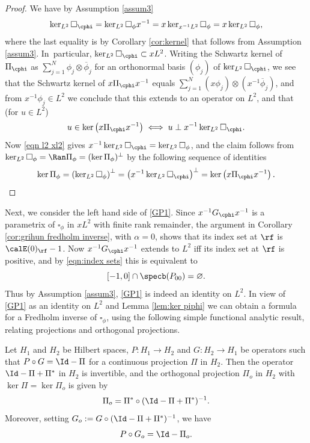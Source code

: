 \begin{proof}
We have by Assumption \ref{assum3}
\begin{equation}
\label{eqn l2 xl2}
\ker_{L^2} \square_{\cphi} = \ker_{L^2} \square_\phi x^{-1} = x\ker_{x^{-1}L^2} \square_\phi = x\ker_{L^2}\square_\phi,
\end{equation}
where the last equality is by Corollary \ref{cor:kernel} that follows from Assumption \ref{assum3}.
In~particular, $\ker_{L^2} \square_{\cphi}\subset xL^2$. Writing the Schwartz kernel of $\Pi_{\cphi}$ as $\sum_{j=1}^N \phi_j\otimes\overline\phi_j$ for an orthonormal basis $(\phi_j)$ of $\ker_{L^2} \square_{\cphi}$, we see that the Schwartz kernel of $x\Pi_{\cphi}x^{-1}$ equals $\sum_{j=1}^N (x\phi_j)\otimes(x^{-1}\overline\phi_j)$, and from $x^{-1}\phi_j\in L^2$ we conclude that this extends to an operator on $L^2$, and that (for $u \in L^2$)
\[
u\in \ker \left(x \Pi_{\cphi} x^{-1} \right) \iff u \perp x^{-1}\ker_{L^2} \square_{\cphi}.
\]
Now \eqref{eqn l2 xl2} gives $ x^{-1}\ker_{L^2} \square_{\cphi}=\ker_{L^2}\square_\phi$, and the claim follows from $\ker_{L^2}\square_\phi = \Ran\Pi_\phi=(\ker\Pi_\phi)^\perp$ by the following sequence of identities
\[
\ker \Pi_\phi = \left(\ker_{L^2} \square_\phi \right)^\perp
= \left(x^{-1} \ker_{L^2} \square_{\cphi} \right)^\perp = \ker \left(x \Pi_{\cphi} x^{-1}\right).\qedhere
\]
\end{proof}
Next, we consider the left hand side of \eqref{GP1}.
Since $x^{-1}G_{\cphi}x^{-1}$ is a parametrix of $\square_\phi$ in $xL^2$ with finite rank remainder, the argument in Corollary \ref{cor:grihun fredholm inverse}, with $\alpha=0$, shows that its index set at $\rf$ is $\calE(0)_\rf - 1$. Now $x^{-1}G_{\cphi}x^{-1}$ extends to $L^2$ iff its index set at $\rf$ is positive, and by \eqref{eqn:index sets} this is equivalent to
\begin{equation}
\label{eqn:-1,0 condition}
[-1,0]\cap \specb(P_{00})=\varnothing.
\end{equation}
Thus by Assumption \ref{assum3}, \eqref{GP1} is indeed an identity on $L^2$.
In view of \eqref{GP1} as an identity on $L^2$ and Lemma \ref{lem:ker piphi} we can obtain a formula for a Fredholm inverse of
$\square_\phi$, using the following simple functional analytic result, relating projections and orthogonal projections.

\begin{Lemma}\label{funkana}
Let $H_1$ and $H_2$ be Hilbert spaces, $P:H_1\to H_2$ and $G:H_2 \to H_1$ be operators
such that $P\circ G=\Id - \Pi$ for a continuous projection $\Pi$ in $H_2$. Then the operator $\Id - \Pi + \Pi^*$ in $H_2$ is invertible, and the
orthogonal
projection $\Pi_o$ in $H_2$ with $\ker \Pi = \ker \Pi_o$ is given by
\begin{equation}\label{Po}
\Pi_o = \Pi^* \circ (\Id - \Pi + \Pi^*)^{-1}.
\end{equation}
Moreover, setting $G_o:= G \circ (\Id - \Pi + \Pi^*)^{-1}$, we have
\begin{equation}\label{Go}
P\circ G_o=\Id - \Pi_o.
\end{equation}
\end{Lemma}

